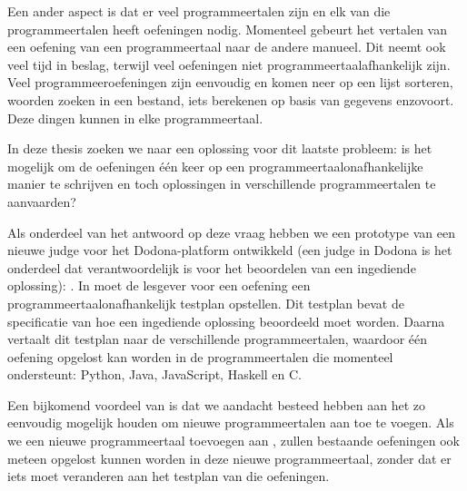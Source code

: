 Een ander aspect is dat er veel programmeertalen zijn en elk van die programmeertalen heeft oefeningen nodig.
Momenteel gebeurt het vertalen van een oefening van een programmeertaal naar de andere manueel.
Dit neemt ook veel tijd in beslag, terwijl veel oefeningen niet programmeertaalafhankelijk zijn.
Veel programmeeroefeningen zijn eenvoudig en komen neer op een lijst sorteren, woorden zoeken in een bestand, iets berekenen op basis van gegevens enzovoort.
Deze dingen kunnen in elke programmeertaal.

In deze thesis zoeken we naar een oplossing voor dit laatste probleem: is het mogelijk om de oefeningen één keer op een programmeertaalonafhankelijke manier te schrijven en toch oplossingen in verschillende programmeertalen te aanvaarden?

Als onderdeel van het antwoord op deze vraag hebben we een prototype van een nieuwe judge voor het Dodona-platform ontwikkeld (een judge in Dodona is het onderdeel dat verantwoordelijk is voor het beoordelen van een ingediende oplossing): \tested{}.
In \tested{} moet de lesgever voor een oefening een programmeertaalonafhankelijk testplan opstellen.
Dit testplan bevat de specificatie van hoe een ingediende oplossing beoordeeld moet worden.
Daarna vertaalt \tested{} dit testplan naar de verschillende programmeertalen, waardoor één oefening opgelost kan worden in de programmeertalen die \tested{} momenteel ondersteunt: Python, Java, JavaScript, Haskell en C.\@

Een bijkomend voordeel van \tested{} is dat we aandacht besteed hebben aan het zo eenvoudig mogelijk houden om nieuwe programmeertalen aan \tested{} toe te voegen.
Als we een nieuwe programmeertaal toevoegen aan \tested{}, zullen bestaande oefeningen ook meteen opgelost kunnen worden in deze nieuwe programmeertaal, zonder dat er iets moet veranderen aan het testplan van die oefeningen.